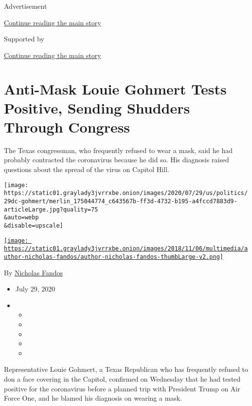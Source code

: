 Advertisement

\protect\hyperlink{after-top}{Continue reading the main story}

Supported by

\protect\hyperlink{after-sponsor}{Continue reading the main story}

\hypertarget{anti-mask-louie-gohmert-tests-positive-sending-shudders-through-congress}{%
\section{Anti-Mask Louie Gohmert Tests Positive, Sending Shudders
Through
Congress}\label{anti-mask-louie-gohmert-tests-positive-sending-shudders-through-congress}}

The Texas congressman, who frequently refused to wear a mask, said he
had probably contracted the coronavirus because he did so. His diagnosis
raised questions about the spread of the virus on Capitol Hill.

\texttt{[image: https://static01.graylady3jvrrxbe.onion/images/2020/07/29/us/politics/29dc-gohmert/merlin\_175044774\_c643567b-ff3d-4732-b195-a4fccd7883d9-articleLarge.jpg?quality=75\\\&auto=webp\\\&disable=upscale]}

\href{https://www.nytimes3xbfgragh.onion/by/nicholas-fandos}{\texttt{[image: https://static01.graylady3jvrrxbe.onion/images/2018/11/06/multimedia/author-nicholas-fandos/author-nicholas-fandos-thumbLarge-v2.png]}}

By \href{https://www.nytimes3xbfgragh.onion/by/nicholas-fandos}{Nicholas
Fandos}

\begin{itemize}
\item
  July 29, 2020
\item
  \begin{itemize}
  \item
  \item
  \item
  \item
  \item
  \end{itemize}
\end{itemize}

Representative Louie Gohmert, a Texas Republican who has frequently
refused to don a face covering in the Capitol, confirmed on Wednesday
that he had tested positive for the coronavirus before a planned trip
with President Trump on Air Force One, and he blamed his diagnosis on
wearing a mask.

